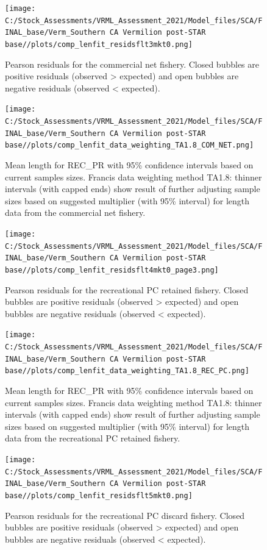 \documentclass[
  english,
  a4paper,
]{article}
\begin{document}
\begin{figure}
\centering
\texttt{[image: C:/Stock\_Assessments/VRML\_Assessment\_2021/Model\_files/SCA/FINAL\_base/Verm\_Southern CA Vermilion post-STAR base//plots/comp\_lenfit\_residsflt3mkt0.png]}
\caption{Pearson residuals for the commercial net fishery. Closed bubbles are positive residuals (observed \textgreater{} expected) and open bubbles are negative residuals (observed \textless{} expected).\label{fig:len-pearson-COM-NET}}
\end{figure}

\begin{figure}
\centering
\texttt{[image: C:/Stock\_Assessments/VRML\_Assessment\_2021/Model\_files/SCA/FINAL\_base/Verm\_Southern CA Vermilion post-STAR base//plots/comp\_lenfit\_data\_weighting\_TA1.8\_COM\_NET.png]}
\caption{Mean length for REC\_PR with 95\% confidence intervals based on current samples sizes. Francis data weighting method TA1.8: thinner intervals (with capped ends) show result of further adjusting sample sizes based on suggested multiplier (with 95\% interval) for length data from the commercial net fishery.\label{fig:mean-len-fit-COM-NET}}
\end{figure}

\begin{figure}
\centering
\texttt{[image: C:/Stock\_Assessments/VRML\_Assessment\_2021/Model\_files/SCA/FINAL\_base/Verm\_Southern CA Vermilion post-STAR base//plots/comp\_lenfit\_residsflt4mkt0\_page3.png]}
\caption{Pearson residuals for the recreational PC retained fishery. Closed bubbles are positive residuals (observed \textgreater{} expected) and open bubbles are negative residuals (observed \textless{} expected).\label{fig:len-pearson-REC-PC}}
\end{figure}

\begin{figure}
\centering
\texttt{[image: C:/Stock\_Assessments/VRML\_Assessment\_2021/Model\_files/SCA/FINAL\_base/Verm\_Southern CA Vermilion post-STAR base//plots/comp\_lenfit\_data\_weighting\_TA1.8\_REC\_PC.png]}
\caption{Mean length for REC\_PR with 95\% confidence intervals based on current samples sizes. Francis data weighting method TA1.8: thinner intervals (with capped ends) show result of further adjusting sample sizes based on suggested multiplier (with 95\% interval) for length data from the recreational PC retained fishery.\label{fig:mean-len-fit-REC-PC}}
\end{figure}

\begin{figure}
\centering
\texttt{[image: C:/Stock\_Assessments/VRML\_Assessment\_2021/Model\_files/SCA/FINAL\_base/Verm\_Southern CA Vermilion post-STAR base//plots/comp\_lenfit\_residsflt5mkt0.png]}
\caption{Pearson residuals for the recreational PC discard fishery. Closed bubbles are positive residuals (observed \textgreater{} expected) and open bubbles are negative residuals (observed \textless{} expected).\label{fig:len-pearson-REC-PC-DIS}}
\end{figure}
\end{document}
